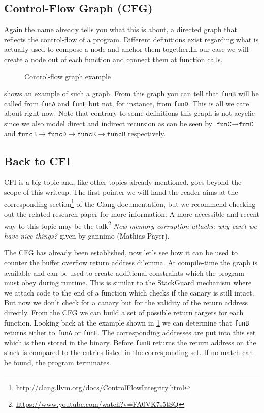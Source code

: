 \documentclass[article]{uibk}
\begin{document}
\subsection{Control-Flow Graph (CFG)}

Again the name already tells you what this is about, a directed graph that
reflects the control-flow of a program. Different definitions exist regarding
what is actually used to compose a node and anchor them together.In our case we
will create a node out of each function and connect them at function calls.

\begin{figure}[H]
    \centering
    
    \caption{Control-flow graph example}
    \label{fig:cfg}
\end{figure}

 shows an example of such a graph. From this graph you can tell
that \texttt{funB} will be called from \texttt{funA} and \texttt{funE} but not,
for instance, from \texttt{funD}. This is all we care about right now. Note
that contrary to some definitions this graph is not acyclic since we also model
direct and indirect recursion as can be seen by $\texttt{funC} \to
\texttt{funC}$ and $\texttt{funcB} \to \texttt{funcD} \to \texttt{funcE} \to
\texttt{funcB}$ respectively.

\subsection{Back to CFI}

CFI is a big topic and, like other topics already mentioned, goes beyond the
scope of this writeup. The first pointer we will hand the reader aims at the
corresponding
section\footnote{\url{http://clang.llvm.org/docs/ControlFlowIntegrity.html}} of
the Clang documentation, but we recommend checking out the related research
paper \cite{ms_cfi} for more information. A more accessible and recent way to
this topic may be the
talk\footnote{\url{https://www.youtube.com/watch?v=FA0VK7s5tSQ}} \textit{New
memory corruption attacks: why can't we have nice things?} given by gannimo
(Mathias Payer).

The CFG has already been established, now let's see how it can be used to
counter the buffer overflow return address dilemma. At compile-time the graph
is available and can be used to create additional constraints which the program
must obey during runtime. This is similar to the StackGuard mechanism where we
attach code to the end of a function which checks if the canary is still
intact. But now we don't check for a canary but for the validity of the return
address directly. From the CFG we can build a set of possible return targets
for each function. Looking back at the example shown in \cref{fig:cfg} we can
determine that \texttt{funB} returns either to \texttt{funA} or \texttt{funE}.
The corresponding addresses are put into this set which is then stored in the
binary. Before \texttt{funB} returns the return address on the stack is
compared to the entries listed in the corresponding set. If no match can be
found, the program terminates.
\end{document}
